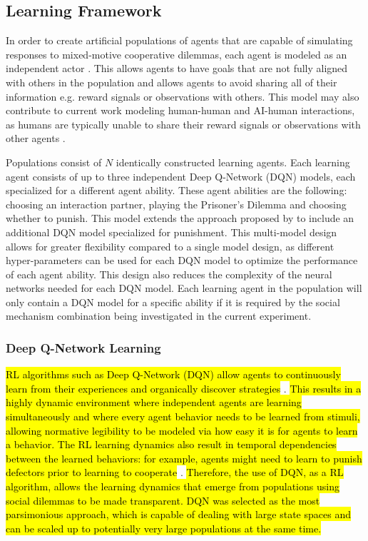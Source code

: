 \documentclass[sn-aps,numbered]{sn-jnl}%
\theoremstyle{thmstyleone}%
\theoremstyle{thmstyletwo}%
\theoremstyle{thmstylethree}%
\begin{document}
\subsection{Learning Framework\label{learning_agents}}

In order to create artificial populations of agents that are capable of simulating responses to mixed-motive cooperative dilemmas, each agent is modeled as an independent actor \citep{mirco_partner_selection, ssd, learning_to_penalise_other_agents, perolat2017multi}. This allows agents to have goals that are not fully aligned with others in the population and allows agents to avoid sharing all of their information e.g. reward signals or observations with others. This model may also contribute to current work modeling human-human and AI-human interactions, as humans are typically unable to share their reward signals or observations with other agents \citep{learning_social_norms_punish}.

Populations consist of $N$ identically constructed learning agents. Each learning agent consists of up to three independent Deep Q-Network (DQN) models, each specialized for a different agent ability. These agent abilities are the following: choosing an interaction partner, playing the Prisoner's Dilemma and choosing whether to punish. This model extends the approach proposed by \citep{mirco_partner_selection} to include an additional DQN model specialized for punishment. This multi-model design allows for greater flexibility compared to a single model design, as different hyper-parameters can be used for each DQN model to optimize the performance of each agent ability. This design also reduces the complexity of the neural networks needed for each DQN model. Each learning agent in the population will only contain a DQN model for a specific ability if it is required by the social mechanism combination being investigated in the current experiment. 

\subsubsection{Deep Q-Network Learning}

\hl{RL algorithms such as Deep Q-Network (DQN) allow agents to continuously learn from their experiences and organically discover strategies} \citep{coop_reputation_mirco}. \hl{This results in a highly dynamic environment where independent agents are learning simultaneously and where every agent behavior needs to be learned from stimuli, allowing normative legibility to be modeled via how easy it is for agents to learn a behavior. The RL learning dynamics also result in temporal dependencies between the learned behaviors: for example, agents might need to learn to punish defectors prior to learning to cooperate} \citep{silly_rules_ssd}. \hl{Therefore, the use of DQN, as a RL algorithm, allows the learning dynamics that emerge from populations using social dilemmas to be made transparent. DQN was selected as the most parsimonious approach, which is capable of dealing with large state spaces and can be scaled up to potentially very large populations at the same time.}
\end{document}
